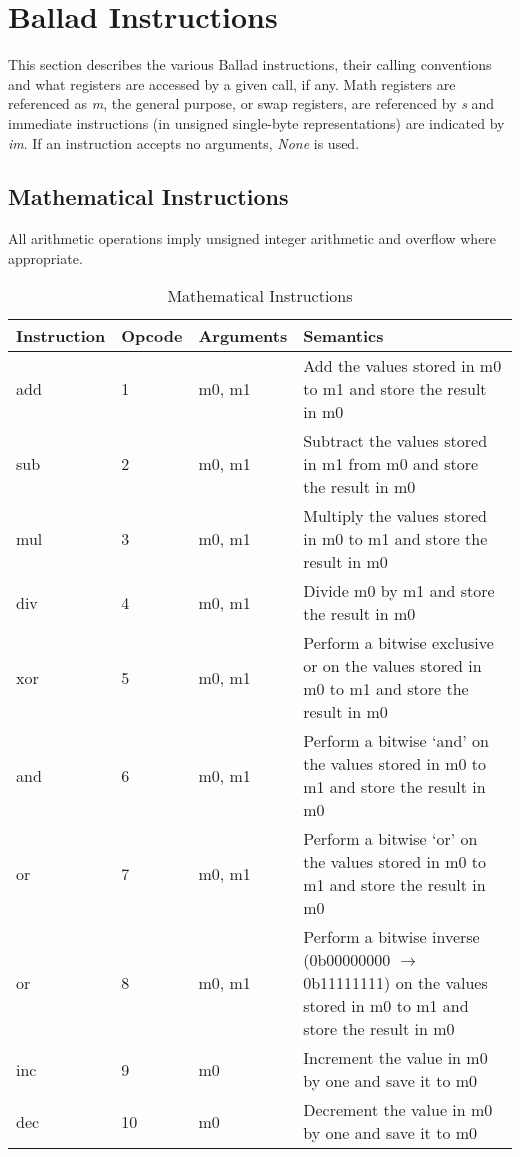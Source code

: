 \clearpage
\section{Ballad Instructions} This section describes the various Ballad
instructions, their calling conventions and what registers are accessed by a
given call, if any. Math registers are referenced as \emph{m}, the general
purpose, or swap registers, are referenced by \emph{s} and immediate
instructions (in unsigned single-byte representations) are indicated by
\emph{im}. If an instruction accepts no arguments, \emph{None} is used.

\subsection{Mathematical Instructions}
All arithmetic operations imply unsigned integer arithmetic and overflow where
appropriate.
\\
\begin{table}[h!]
\centering
\caption{Mathematical Instructions}
\begin{tabular}{| l | l | l | p{8cm} | }
	\hline
	Instruction & Opcode & Arguments & Semantics \\\hline
		       add & 1 & m0, m1 & Add the values stored in m0 to m1 and store the result
	in m0 \\\hline
		       sub & 2 & m0, m1 & Subtract the values stored in m1 from m0 and store the result
	in m0 \\\hline
		       mul & 3 & m0, m1 & Multiply the values stored in m0 to m1 and store the result
	in m0 \\\hline
		       div & 4 & m0, m1 & Divide m0 by m1 and store the result
	in m0 \\\hline
		       xor & 5 & m0, m1 & Perform a bitwise exclusive or on the values stored in   
	m0 to m1 and store the result in m0 \\\hline
		       and & 6 & m0, m1 & Perform a bitwise `and' on the values stored in   
	m0 to m1 and store the result in m0 \\\hline
		       or & 7 & m0, m1 & Perform a bitwise `or' on the values stored in   
	m0 to m1 and store the result in m0 \\\hline
		       or & 8 & m0, m1 & Perform a bitwise inverse (0b00000000 $\rightarrow$ 0b11111111) on the 
	values stored in   
	m0 to m1 and store the result in m0 \\\hline
	inc & 9 & m0 & Increment the value in m0 by one and save it to m0 \\\hline
	dec & 10 & m0 & Decrement the value in m0 by one and save it to m0 \\\hline
\end{tabular}
\end{table}
\clearpage
